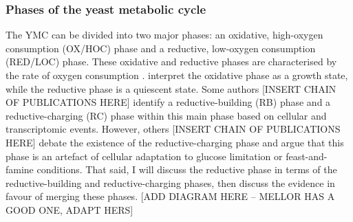 \subsubsection{Phases of the yeast metabolic cycle}
\label{subsubsec:intro-ymc-definition-phases}
The YMC can be divided into two major phases: an oxidative, high-oxygen consumption (OX/HOC) phase and a reductive, low-oxygen consumption (RED/LOC) phase.
These oxidative and reductive phases are characterised by the rate of oxygen consumption \citep{mellorMolecularBasisMetabolic2016}.
\citet{krishnaMinimalPushPull2018} interpret the oxidative phase as a growth state, while the reductive phase is a quiescent state.
Some authors [INSERT CHAIN OF PUBLICATIONS HERE] identify a reductive-building (RB) phase and a reductive-charging (RC) phase within this main phase based on cellular and transcriptomic events.
However, others [INSERT CHAIN OF PUBLICATIONS HERE] debate the existence of the reductive-charging phase and argue that this phase is an artefact of cellular adaptation to glucose limitation or feast-and-famine conditions.
That said, I will discuss the reductive phase in terms of the reductive-building and reductive-charging phases, then discuss the evidence in favour of merging these phases.
[ADD DIAGRAM HERE -- MELLOR HAS A GOOD ONE, ADAPT HERS]

